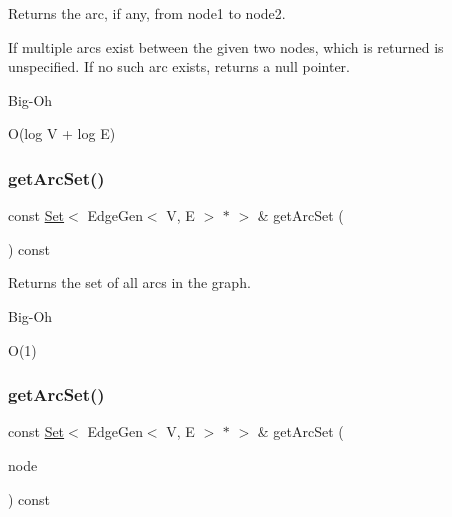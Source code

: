 Returns the arc, if any, from node1 to node2. 

If multiple arcs exist between the given two nodes, which is returned is unspecified. If no such arc exists, returns a null pointer. \begin{DoxyRefDesc}{Big-\/\+Oh}
\item[\mbox{\hyperlink{BigOh__BigOh000061}{Big-\/\+Oh}}]O(log V + log E) \end{DoxyRefDesc}
\mbox{\label{classGraph_a0690edaeae8d5256189ae2e8541788b5}} 
\subsubsection{\texorpdfstring{get\+Arc\+Set()}{getArcSet()}\hspace{0.1cm}{\footnotesize\ttfamily [1/3]}}
{\footnotesize\ttfamily const \mbox{\hyperlink{classSet}{Set}}$<$ Edge\+Gen$<$ V, E $>$  $\ast$ $>$ \& get\+Arc\+Set (\begin{DoxyParamCaption}{ }\end{DoxyParamCaption}) const\hspace{0.3cm}{\ttfamily [inherited]}}



Returns the set of all arcs in the graph. 

\begin{DoxyRefDesc}{Big-\/\+Oh}
\item[\mbox{\hyperlink{BigOh__BigOh000062}{Big-\/\+Oh}}]O(1) \end{DoxyRefDesc}
\mbox{\label{classGraph_a17cfc7f4d8c738fc6f51813f50be6400}} 
\subsubsection{\texorpdfstring{get\+Arc\+Set()}{getArcSet()}\hspace{0.1cm}{\footnotesize\ttfamily [2/3]}}
{\footnotesize\ttfamily const \mbox{\hyperlink{classSet}{Set}}$<$ Edge\+Gen$<$ V, E $>$  $\ast$ $>$ \& get\+Arc\+Set (\begin{DoxyParamCaption}\item[{\mbox{\hyperlink{classVertexGen}{Vertex\+Gen}}$<$ V, E $>$  $\ast$}]{node }\end{DoxyParamCaption}) const\hspace{0.3cm}{\ttfamily [inherited]}}



